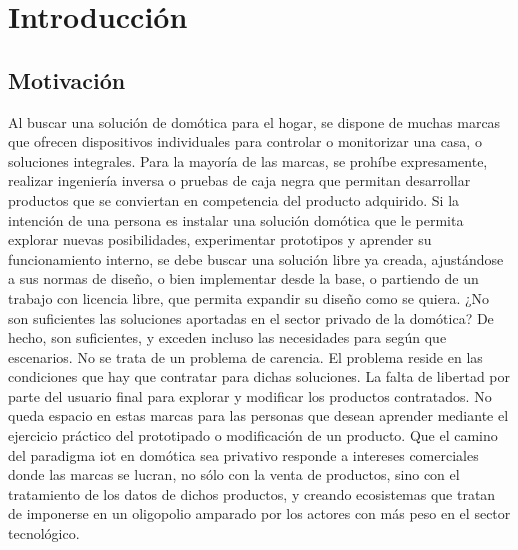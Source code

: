 \cleardoublepage

\chapter{Introducción}

\section{Motivación}
\label{ch:Capitulo1}

Al buscar una solución de domótica para el hogar, se dispone de muchas marcas que ofrecen dispositivos individuales para controlar o monitorizar una casa, o soluciones integrales. Para la mayoría de las marcas, se prohíbe expresamente, realizar ingeniería inversa o pruebas de caja negra que permitan desarrollar productos que se conviertan en competencia del producto adquirido. Si la intención de una persona es instalar una solución domótica que le permita explorar nuevas posibilidades, experimentar prototipos y aprender su funcionamiento interno, se debe buscar una solución libre ya creada, ajustándose a sus normas de diseño, o bien implementar desde la base, o partiendo de un trabajo con licencia libre, que permita expandir su diseño como se quiera. ¿No son suficientes las soluciones aportadas en el sector privado de la domótica? De hecho, son suficientes, y exceden incluso las necesidades para según que escenarios. No se trata de un problema de carencia. El problema reside en las condiciones que hay que contratar para dichas soluciones. La falta de libertad por parte del usuario final para explorar y modificar los productos contratados. No queda espacio en estas marcas para las personas que desean aprender mediante el ejercicio práctico del prototipado o modificación de un producto. Que el camino del paradigma \gls{iot} en domótica sea privativo responde a intereses comerciales donde las marcas se lucran, no sólo con la venta de productos, sino con el tratamiento de los datos de dichos productos, y creando ecosistemas que tratan de imponerse en un oligopolio amparado por los actores con más peso en el sector tecnológico.

\vspace{1cm}

